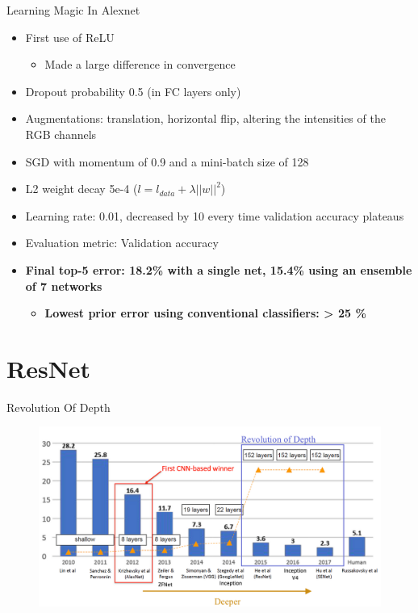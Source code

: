 \documentclass[serif, aspectratio=169]{beamer}
\begin{document}
\begin{frame}{Learning Magic In Alexnet}
	\begin{itemize}
		\item First use of ReLU
		\begin{itemize}
			\item Made a large difference in convergence
		\end{itemize}
		\item Dropout probability 0.5 (in FC layers only)
		\item Augmentations: translation, horizontal flip, altering the intensities of the RGB channels
		\item SGD with momentum of 0.9 and a mini-batch size of 128
		\item L2 weight decay 5e-4 ($l=l_{data} + \lambda||w||^2$)
		\item Learning rate: 0.01, decreased by 10 every time validation accuracy plateaus
		\item Evaluation metric: Validation accuracy
		\item \textbf{Final top-5 error: 18.2\% with a single net, 15.4\% using an ensemble of 7 networks}
		\begin{itemize}
			\item \textbf{Lowest prior error using conventional classifiers: > 25 \%}
		\end{itemize}
	\end{itemize}
\end{frame}

\section{ResNet}

\begin{frame}{Revolution Of Depth}
	\begin{figure}[htpb]
		\begin{center}
			\includegraphics[keepaspectratio, scale=0.25]{pic/resnet-chart}
		\end{center}
	\end{figure}
\end{frame}
\end{document}

